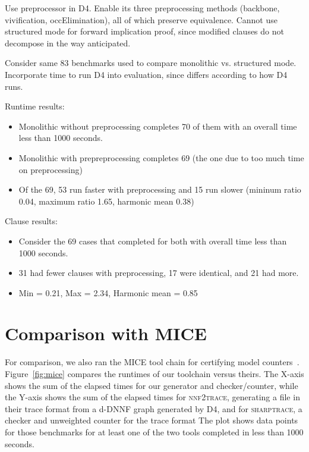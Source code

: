 \documentclass[letterpaper,USenglish,cleveref, autoref, thm-restate]{lipics-v2021}
\begin{document}



Use preprocessor in D4.  Enable its three preprocessing methods
(backbone, vivification, occElimination), all of which preserve
equivalence.  Cannot use structured mode for forward implication
proof, since modified clauses do not decompose in the way anticipated.

Consider same 83 benchmarks used to compare monolithic vs. structured mode.
Incorporate time to run D4 into evaluation, since differs according to
how D4 runs.

Runtime results:
\begin{itemize}
\item Monolithic without preprocessing completes 70  of them with an overall time less than 1000 seconds.
\item Monolithic with prepreprocessing completes 69 (the one due to too much time on preprocessing)
\item Of the 69, 53 run faster with preprocessing and 15 run slower (mininum ratio 0.04, maximum ratio 1.65, harmonic mean 0.38)
\end{itemize}

Clause results:
\begin{itemize}
\item Consider the 69 cases that completed for both with overall time less than 1000 seconds.
\item 31 had fewer clauses with preprocessing, 17 were identical, and 21 had more.
\item Min = 0.21, Max = 2.34, Harmonic mean = 0.85
\end{itemize}

\section{Comparison with MICE}




For comparison, we also ran the MICE tool chain for certifying model
counters~\cite{fichte:sat:2022}.  Figure~\ref{fig:mice} compares the
runtimes of our toolchain versus theirs.  The X-axis shows the sum of
the elapsed times for our generator and checker/counter, while the
Y-axis shows the sum of the elapsed times for \textsc{nnf2trace},
generating a file in their trace format from a d-DNNF graph generated
by D4, and for \textsc{sharptrace}, a checker and unweighted counter for the trace format
The plot shows data points for those benchmarks for at least one of
the two tools completed in less than 1000 seconds.
\end{document}
